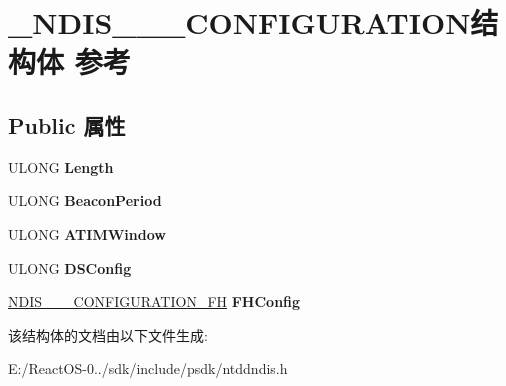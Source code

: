 \hypertarget{struct___n_d_i_s__802__11___c_o_n_f_i_g_u_r_a_t_i_o_n}{}\section{\+\_\+\+N\+D\+I\+S\+\_\+\_\+\_\+\+C\+O\+N\+F\+I\+G\+U\+R\+A\+T\+I\+O\+N结构体 参考}
\label{struct___n_d_i_s__802__11___c_o_n_f_i_g_u_r_a_t_i_o_n}
\subsection*{Public 属性}
\begin{DoxyCompactItemize}
\item 
\mbox{\label{struct___n_d_i_s__802__11___c_o_n_f_i_g_u_r_a_t_i_o_n_a1821f45703cb207172f58a2818c8165c}} 
U\+L\+O\+NG {\bfseries Length}
\item 
\mbox{\label{struct___n_d_i_s__802__11___c_o_n_f_i_g_u_r_a_t_i_o_n_a989e218114d5dea80c845221dc2ac4ef}} 
U\+L\+O\+NG {\bfseries Beacon\+Period}
\item 
\mbox{\label{struct___n_d_i_s__802__11___c_o_n_f_i_g_u_r_a_t_i_o_n_a0bb0ba538513c20ba741e78ad4cded10}} 
U\+L\+O\+NG {\bfseries A\+T\+I\+M\+Window}
\item 
\mbox{\label{struct___n_d_i_s__802__11___c_o_n_f_i_g_u_r_a_t_i_o_n_ab1f8da556aa765d31a3aacb3b82b61a1}} 
U\+L\+O\+NG {\bfseries D\+S\+Config}
\item 
\mbox{\label{struct___n_d_i_s__802__11___c_o_n_f_i_g_u_r_a_t_i_o_n_ae21fc9b780c0bc0d7601ebd8cda334c7}} 
\hyperlink{struct___n_d_i_s__802__11___c_o_n_f_i_g_u_r_a_t_i_o_n___f_h}{N\+D\+I\+S\+\_\+\_\+\_\+\+C\+O\+N\+F\+I\+G\+U\+R\+A\+T\+I\+O\+N\+\_\+\+FH} {\bfseries F\+H\+Config}
\end{DoxyCompactItemize}


该结构体的文档由以下文件生成\+:\begin{DoxyCompactItemize}
\item 
E\+:/\+React\+O\+S-\/0../sdk/include/psdk/ntddndis.\+h\end{DoxyCompactItemize}
